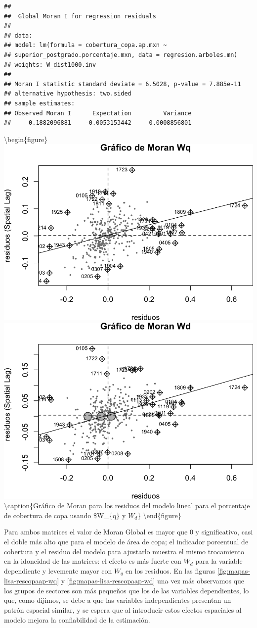 \documentclass[12pt,]{book}
\begin{document}
\begin{verbatim}
## 
##  Global Moran I for regression residuals
## 
## data:  
## model: lm(formula = cobertura_copa.ap.mxn ~
## superior_postgrado.porcentaje.mxn, data = regresion.arboles.mn)
## weights: W_dist1000.inv
## 
## Moran I statistic standard deviate = 6.5028, p-value = 7.885e-11
## alternative hypothesis: two.sided
## sample estimates:
## Observed Moran I      Expectation         Variance 
##     0.1882096881    -0.0053153442     0.0008856801
\end{verbatim}

\textbackslash{}begin\{figure\}
\includegraphics[width=0.49\linewidth]{tesis-unigis_files/figure-latex/moranplot-rescopaap-w-1}
\includegraphics[width=0.49\linewidth]{tesis-unigis_files/figure-latex/moranplot-rescopaap-w-2}
\textbackslash{}caption\{Gráfico de Moran para los residuos del modelo
lineal para el porcentaje de cobertura de copa usando \$W\_\{q\} y
\(W_{d}\)\}\label{fig:moranplot-rescopaap-w} \textbackslash{}end\{figure\}

Para ambos matrices el valor de Moran Global es mayor que 0 y
significativo, casi el doble más alto que para el modelo de área de
copa; el indicador porcentual de cobertura y el residuo del modelo para
ajustarlo muestra el mismo trocamiento en la idoneidad de las matrices:
el efecto es más fuerte con \(W_d\) para la variable dependiente y
levemente mayor con \(W_q\) en los residuos. En las figuras
\ref{fig:mapas-lisa-rescopaap-wq} y \ref{fig:mapas-lisa-rescopaap-wd}
una vez más observamos que los grupos de sectores son más pequeños que
los de las variables dependientes, lo que, como dijimos, se debe a que
las variables independientes presentan un patrón espacial similar, y se
espera que al introducir estos efectos espaciales al modelo mejora la
confiabilidad de la estimación.
\end{document}
